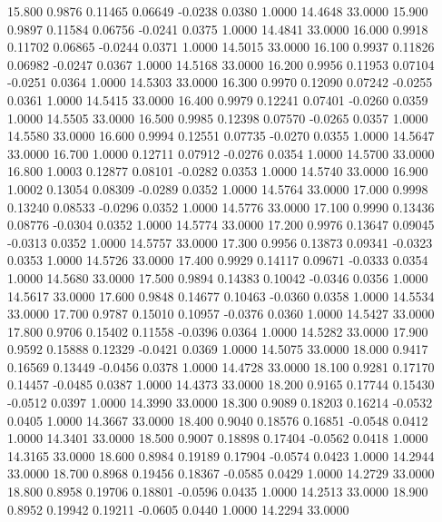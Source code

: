   15.800   0.9876   0.11465   0.06649  -0.0238   0.0380   1.0000  14.4648  33.0000
  15.900   0.9897   0.11584   0.06756  -0.0241   0.0375   1.0000  14.4841  33.0000
  16.000   0.9918   0.11702   0.06865  -0.0244   0.0371   1.0000  14.5015  33.0000
  16.100   0.9937   0.11826   0.06982  -0.0247   0.0367   1.0000  14.5168  33.0000
  16.200   0.9956   0.11953   0.07104  -0.0251   0.0364   1.0000  14.5303  33.0000
  16.300   0.9970   0.12090   0.07242  -0.0255   0.0361   1.0000  14.5415  33.0000
  16.400   0.9979   0.12241   0.07401  -0.0260   0.0359   1.0000  14.5505  33.0000
  16.500   0.9985   0.12398   0.07570  -0.0265   0.0357   1.0000  14.5580  33.0000
  16.600   0.9994   0.12551   0.07735  -0.0270   0.0355   1.0000  14.5647  33.0000
  16.700   1.0000   0.12711   0.07912  -0.0276   0.0354   1.0000  14.5700  33.0000
  16.800   1.0003   0.12877   0.08101  -0.0282   0.0353   1.0000  14.5740  33.0000
  16.900   1.0002   0.13054   0.08309  -0.0289   0.0352   1.0000  14.5764  33.0000
  17.000   0.9998   0.13240   0.08533  -0.0296   0.0352   1.0000  14.5776  33.0000
  17.100   0.9990   0.13436   0.08776  -0.0304   0.0352   1.0000  14.5774  33.0000
  17.200   0.9976   0.13647   0.09045  -0.0313   0.0352   1.0000  14.5757  33.0000
  17.300   0.9956   0.13873   0.09341  -0.0323   0.0353   1.0000  14.5726  33.0000
  17.400   0.9929   0.14117   0.09671  -0.0333   0.0354   1.0000  14.5680  33.0000
  17.500   0.9894   0.14383   0.10042  -0.0346   0.0356   1.0000  14.5617  33.0000
  17.600   0.9848   0.14677   0.10463  -0.0360   0.0358   1.0000  14.5534  33.0000
  17.700   0.9787   0.15010   0.10957  -0.0376   0.0360   1.0000  14.5427  33.0000
  17.800   0.9706   0.15402   0.11558  -0.0396   0.0364   1.0000  14.5282  33.0000
  17.900   0.9592   0.15888   0.12329  -0.0421   0.0369   1.0000  14.5075  33.0000
  18.000   0.9417   0.16569   0.13449  -0.0456   0.0378   1.0000  14.4728  33.0000
  18.100   0.9281   0.17170   0.14457  -0.0485   0.0387   1.0000  14.4373  33.0000
  18.200   0.9165   0.17744   0.15430  -0.0512   0.0397   1.0000  14.3990  33.0000
  18.300   0.9089   0.18203   0.16214  -0.0532   0.0405   1.0000  14.3667  33.0000
  18.400   0.9040   0.18576   0.16851  -0.0548   0.0412   1.0000  14.3401  33.0000
  18.500   0.9007   0.18898   0.17404  -0.0562   0.0418   1.0000  14.3165  33.0000
  18.600   0.8984   0.19189   0.17904  -0.0574   0.0423   1.0000  14.2944  33.0000
  18.700   0.8968   0.19456   0.18367  -0.0585   0.0429   1.0000  14.2729  33.0000
  18.800   0.8958   0.19706   0.18801  -0.0596   0.0435   1.0000  14.2513  33.0000
  18.900   0.8952   0.19942   0.19211  -0.0605   0.0440   1.0000  14.2294  33.0000
